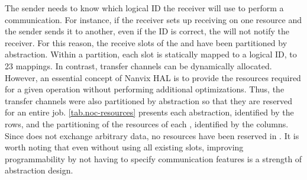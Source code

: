 			The sender needs to know which logical ID the receiver will use to perform
			a communication. For instance, if the receiver sets up receiving on one
			\dnoc resource and the sender sends it to another, even if the ID is correct,
			the \dma will not notify the receiver. For this reason, the receive slots
			of the \cnoc and \dnoc have been partitioned by abstraction. Within a
			partition, each slot is statically mapped to a logical ID,  to 23 mappings.
			In contrast, transfer channels can be dynamically allocated. However,
			an essential concept of Nanvix HAL is to provide the resources required for
			a given operation without performing additional optimizations. Thus, the
			transfer channels were also partitioned by abstraction so that they are
			reserved for an entire job. \autoref{tab.noc-resources} presents each
			abstraction, identified by the rows, and the partitioning of the resources
			of each \noc, identified by the columns. Since \sync does not exchange
			arbitrary data, no resources have been reserved in \dnoc. It is worth
			noting that even without using all existing slots, improving
			programmability by not having to specify communication features is a
			strength of abstraction design.


